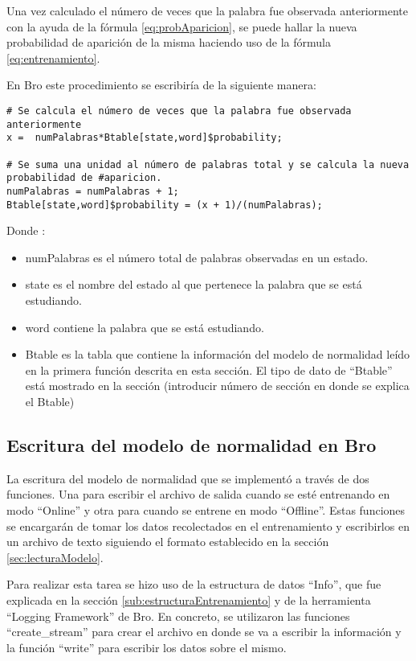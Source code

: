 Una vez calculado el número de veces que la palabra fue observada anteriormente con la ayuda de la fórmula \ref{eq:probAparicion}, se puede hallar la nueva probabilidad de aparición de la misma haciendo uso de la fórmula \ref{eq:entrenamiento}.

En Bro este procedimiento se escribiría de la siguiente manera:

\begin{verbatim}
# Se calcula el número de veces que la palabra fue observada anteriormente
x =  numPalabras*Btable[state,word]$probability;

# Se suma una unidad al número de palabras total y se calcula la nueva probabilidad de #aparicion.
numPalabras = numPalabras + 1;
Btable[state,word]$probability = (x + 1)/(numPalabras);
\end{verbatim}

Donde :
\begin{itemize}
\item numPalabras es el número total de palabras observadas en un estado.
\item state es el nombre del estado al que pertenece la palabra que se está estudiando.
\item word contiene la palabra que se está estudiando.
\item Btable es la tabla que contiene la información del modelo de normalidad leído en la primera función descrita en esta sección. El tipo de dato de “Btable” está mostrado en la sección (introducir número de sección en donde se explica el Btable)
\end{itemize}

\subsection{Escritura del modelo de normalidad en Bro}

    La escritura del modelo de normalidad que se implementó a través de dos funciones. Una para escribir el archivo de salida cuando se esté entrenando en modo “Online” y otra para cuando se entrene en modo “Offline”. Estas funciones se encargarán de tomar los datos recolectados en el entrenamiento y escribirlos en un archivo de texto siguiendo el formato establecido en la sección \ref{sec:lecturaModelo}.

    Para realizar esta tarea se hizo uso de la estructura de datos “Info”, que fue explicada en la sección \ref{sub:estructuraEntrenamiento} y de la herramienta “Logging Framework” de Bro. En concreto, se utilizaron las funciones “create\_stream” para crear el archivo en donde se va a escribir la información y la función “write”  para escribir los datos sobre el mismo.

